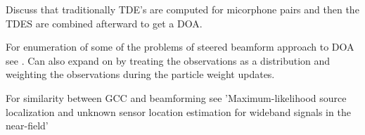 \documentclass{uiucecethesis09}
\begin{document}
Discuss that traditionally TDE's are computed for micorphone pairs and then the TDES are combined afterward to get a DOA.

For enumeration of some of the problems of steered beamform approach to DOA see \cite{ward2002particle}. Can also expand on \cite{ward2002particle} by treating the observations as a distribution and weighting the observations during the particle weight updates.


For similarity between GCC and beamforming see 'Maximum-likelihood source
localization and unknown sensor location estimation for wideband
signals in the near-field'
\end{document}
